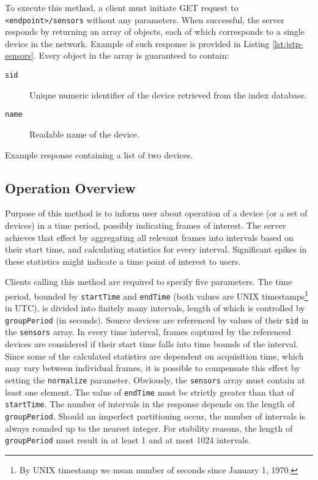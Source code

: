 To execute this method, a client must initiate GET request to \texttt{<endpoint>/sensors} without any parameters. When successful, the server responds by returning an array of objects, each of which corresponds to a single device in the network. Example of such response is provided in Listing \ref{lst:jstp-sensors}. Every object in the array is guaranteed to contain:

\begin{description}
	\item[\texttt{sid}]
	Unique numeric identifier of the device retrieved from the index database.

	\item[\texttt{name}]
	Readable name of the device.
\end{description}

\begin{listing}
    \caption{Example response containing a list of two devices.}
    \label{lst:jstp-sensors}
\end{listing}

\subsection{Operation Overview}
Purpose of this method is to inform user about operation of a device (or a set of devices) in a time period, possibly indicating frames of interest. The server achieves that effect by aggregating all relevant frames into intervals based on their start time, and calculating statistics for every interval. Significant spikes in these statistics might indicate a time point of interest to users.

Clients calling this method are required to specify five parameters. The time period, bounded by \texttt{startTime} and \texttt{endTime} (both values are UNIX timestamps\footnote{By UNIX timestamp we mean number of seconds since January 1, 1970.} in UTC), is divided into finitely many intervals, length of which is controlled by \texttt{groupPeriod} (in seconds). Source devices are referenced by values of their \texttt{sid} in the \texttt{sensors} array. In every time interval, frames captured by the referenced devices are considered if their start time falls into time bounds of the interval. Since some of the calculated statistics are dependent on acquisition time, which may vary between individual frames, it is possible to compensate this effect by setting the \texttt{normalize} parameter. Obviously, the \texttt{sensors} array must contain at least one element. The value of \texttt{endTime} must be strictly greater than that of \texttt{startTime}. The number of intervals in the response depends on the length of \texttt{groupPeriod}. Should an imperfect partitioning occur, the number of intervals is always rounded up to the nearest integer. For stability reasons, the length of \texttt{groupPeriod} must result in at least 1 and at most 1024 intervals.

